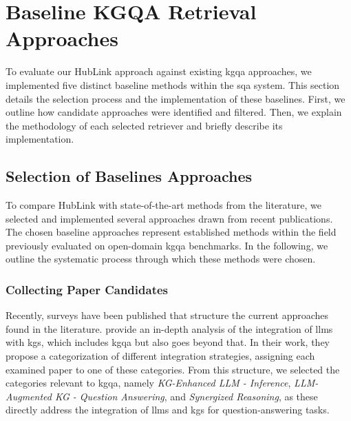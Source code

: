 
\section{Baseline KGQA Retrieval Approaches}
\label{sec:implementation_baselines}

To evaluate our HubLink approach against existing \gls{kgqa} approaches, we implemented five distinct baseline methods within the \gls{sqa} system. This section details the selection process and the implementation of these baselines. First, we outline how candidate approaches were identified and filtered. Then, we explain the methodology of each selected retriever and briefly describe its implementation.


\subsection{Selection of Baselines Approaches}

To compare HubLink with state-of-the-art methods from the literature, we selected and implemented several approaches drawn from recent publications. The chosen baseline approaches represent established methods within the field previously evaluated on open-domain \gls{kgqa} benchmarks. In the following, we outline the systematic process through which these methods were chosen.

\subsubsection{Collecting Paper Candidates} 

Recently, surveys have been published that structure the current approaches found in the literature. \textcite{pan_unifying_2024} provide an in-depth analysis of the integration of \glspl{llm} with \glspl{kg}, which includes \gls{kgqa} but also goes beyond that. In their work, they propose a categorization of different integration strategies, assigning each examined paper to one of these categories. From this structure, we selected the categories relevant to \gls{kgqa}, namely \emph{KG-Enhanced LLM - Inference}, \emph{LLM-Augmented KG - Question Answering}, and \emph{Synergized Reasoning}, as these directly address the integration of \glspl{llm} and \glspl{kg} for question-answering tasks. 

